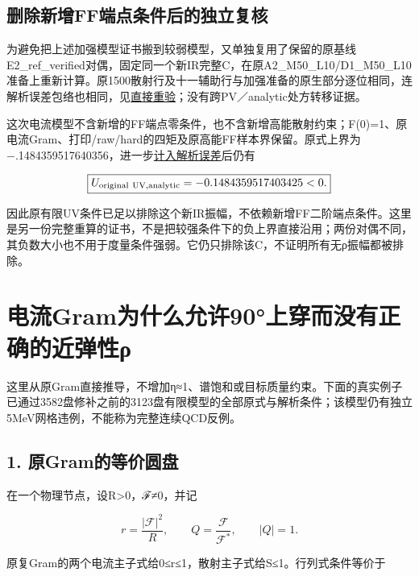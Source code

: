 \documentclass[
  10pt,
  a4paper,
]{article}
\begin{document}
\subsection{删除新增FF端点条件后的独立复核}\label{ux5220ux9664ux65b0ux589effux7aefux70b9ux6761ux4ef6ux540eux7684ux72ecux7acbux590dux6838}

为避免把上述加强模型证书搬到较弱模型，又单独复用了保留的原基线E2\_ref\_verified对偶，固定同一个新IR完整C，在原A2\_M50\_L10/D1\_M50\_L10准备上重新计算。原1500散射行及十一辅助行与加强准备的原生部分逐位相同，连解析误差包络也相同，见\href{../ORIGINAL_NATIVE_PREFIX_REPLAY.json}{直接重验}；没有跨PV／analytic处方转移证据。

这次电流模型不含新增的FF端点零条件，也不含新增高能散射约束；F(0)=1、原电流Gram、打印/raw/hard的四矩及原高能FF样本界保留。原式上界为−.1484359517640356，进一步\href{../original_UV_fixed_new_IR_analytic/report.json}{计入解析误差}后仍有

\[
\boxed{U_{\rm original\ UV,analytic}=-0.1484359517403425<0.}
\]

因此原有限UV条件已足以排除这个新IR振幅，不依赖新增FF二阶端点条件。这里是另一份完整重算的证书，不是把较强条件下的负上界直接沿用；两份对偶不同，其负数大小也不用于度量条件强弱。它仍只排除该C，不证明所有无ρ振幅都被排除。

\newpage

\section{电流Gram为什么允许90°上穿而没有正确的近弹性ρ}\label{ux7535ux6d41gramux4e3aux4ec0ux4e48ux5141ux8bb890ux4e0aux7a7fux800cux6ca1ux6709ux6b63ux786eux7684ux8fd1ux5f39ux6027ux3c1}

这里从原Gram直接推导，不增加η≈1、谱饱和或目标质量约束。下面的真实例子已通过3582盘修补之前的3123盘有限模型的全部原式与解析条件；该模型仍有独立5MeV网格违例，不能称为完整连续QCD反例。

\subsection{1.
原Gram的等价圆盘}\label{ux539fgramux7684ux7b49ux4ef7ux5706ux76d8}

在一个物理节点，设R\textgreater0，ℱ≠0，并记

\[
r=\frac{|\mathcal F|^2}{R},\qquad Q=\frac{\mathcal F}{\mathcal F^*},\qquad |Q|=1.
\]

原复Gram的两个电流主子式给0≤r≤1，散射主子式给\textbar S\textbar≤1。行列式条件等价于
\end{document}
